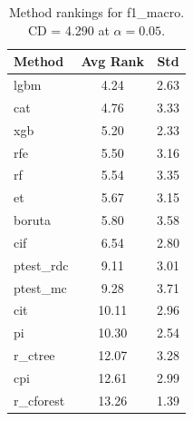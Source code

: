 \begin{table}[h]
\centering
\caption{Method rankings for f1_macro. CD = 4.290 at $\alpha=0.05$.}
\label{tab:ranks_f1_macro}
\begin{tabular}{lcc}
\toprule
Method & Avg Rank & Std \\
\midrule
lgbm & 4.24 & 2.63 \\
cat & 4.76 & 3.33 \\
xgb & 5.20 & 2.33 \\
rfe & 5.50 & 3.16 \\
rf & 5.54 & 3.35 \\
et & 5.67 & 3.15 \\
boruta & 5.80 & 3.58 \\
cif & 6.54 & 2.80 \\
ptest_rdc & 9.11 & 3.01 \\
ptest_mc & 9.28 & 3.71 \\
cit & 10.11 & 2.96 \\
pi & 10.30 & 2.54 \\
r_ctree & 12.07 & 3.28 \\
cpi & 12.61 & 2.99 \\
r_cforest & 13.26 & 1.39 \\
\bottomrule
\end{tabular}
\end{table}
